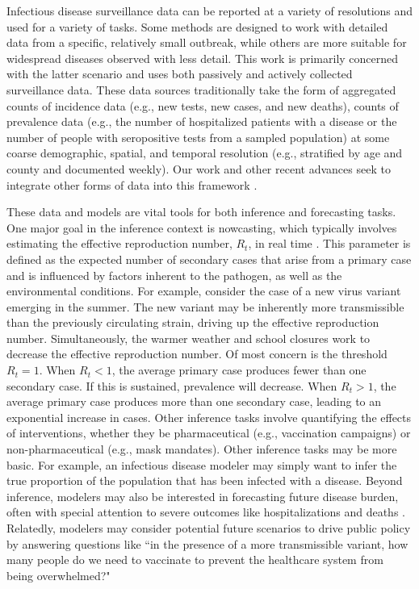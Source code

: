 Infectious disease surveillance data can be reported at a variety of resolutions and used for a variety of tasks.
Some methods are designed to work with detailed data from a specific, relatively small outbreak, while others are more suitable for widespread diseases observed with less detail.
This work is primarily concerned with the latter scenario and uses both passively and actively collected surveillance data.
These data sources traditionally take the form of aggregated counts of incidence data (e.g., new tests, new cases, and new deaths), counts of prevalence data (e.g., the number of hospitalized patients with a disease or the number of people with seropositive tests from a sampled population) at some coarse demographic, spatial, and temporal resolution (e.g., stratified by age and county and documented weekly).
Our work and other recent advances seek to integrate other forms of data into this framework \citep{Rasmussen2011, Tang2022}.

These data and models are vital tools for both inference and forecasting tasks.
One major goal in the inference context is nowcasting, which typically involves estimating the effective reproduction number, \( R_t \), in real time \citep{10.1093/aje/kwt133}.
This parameter is defined as the expected number of secondary cases that arise from a primary case and is influenced by factors inherent to the pathogen, as well as the environmental conditions.
For example, consider the case of a new virus variant emerging in the summer.
The new variant may be inherently more transmissible than the previously circulating strain, driving up the effective reproduction number.
Simultaneously, the warmer weather and school closures work to decrease the effective reproduction number.
Of most concern is the threshold \( R_t = 1 \).
When \( R_t < 1 \), the average primary case produces fewer than one secondary case.
If this is sustained, prevalence will decrease.
When \( R_t > 1 \), the average primary case produces more than one secondary case, leading to an exponential increase in cases.
Other inference tasks involve quantifying the effects of interventions, whether they be pharmaceutical (e.g., vaccination campaigns) or non-pharmaceutical (e.g., mask mandates).
Other inference tasks may be more basic.
For example, an infectious disease modeler may simply want to infer the true proportion of the population that has been infected with a disease.
Beyond inference, modelers may also be interested in forecasting future disease burden, often with special attention to severe outcomes like hospitalizations and deaths \citep{10.1371/journal.pmed.1003793}.
Relatedly, modelers may consider potential future scenarios to drive public policy by answering questions like ``in the presence of a more transmissible variant, how many people do we need to vaccinate to prevent the healthcare system from being overwhelmed?"

